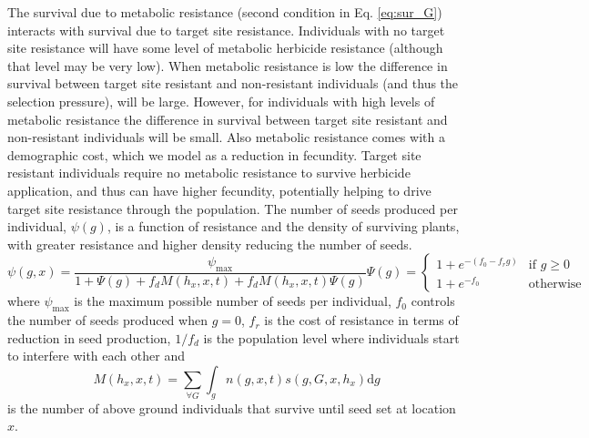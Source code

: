 \documentclass[12pt, a4paper]{article}
\begin{document}
The survival due to metabolic resistance (second condition in Eq. \ref{eq:sur_G}) interacts with survival due to target site resistance. Individuals with no target site resistance will have some level of metabolic herbicide resistance (although that level may be very low). When metabolic resistance is low the difference in survival between target site resistant and non-resistant individuals (and thus the selection pressure), will be large. However, for individuals with high levels of metabolic resistance the difference in survival between target site resistant and non-resistant individuals will be small. Also metabolic resistance comes with a demographic cost, which we model as a reduction in fecundity. Target site resistant individuals require no metabolic resistance to survive herbicide application, and thus can have higher fecundity, potentially helping to drive target site resistance through the population. The number of seeds produced per individual, $\psi(g)$, is a function of resistance and the density of surviving plants, with greater resistance and higher density reducing the number of seeds. 
\begin{subequations}
\begin{equation}\label{eq:seed_production}
	\psi(g, x) = \frac{\psi_\text{max}}{1 + \Psi(g) + f_d M(h_x, x, t) + f_dM(h_x, x, t) \Psi(g)}
\end{equation}  
\begin{equation}
	\Psi(g) = \begin{cases}
		1 + e^{-(f_0 - f_rg)} &\text{if } g \geq 0  \\
		1 + e^{-f_0} &\text{otherwise}
	\end{cases}
\end{equation}
\end{subequations}
where $\psi_\text{max}$ is the maximum possible number of seeds per individual, $f_0$ controls the number of seeds produced when $g = 0$, $f_r$ is the cost of resistance in terms of reduction in seed production, $1/f_d$ is the population level where individuals start to interfere with each other and 
\begin{equation}\label{eq:num_sur}
   M(h_x, x, t) = \sum_{\forall G} \int_g n(g, x, t)s(g, G, x, h_x)\text{d}g
\end{equation}
is the number of above ground individuals that survive until seed set at location $x$.
\end{document}
